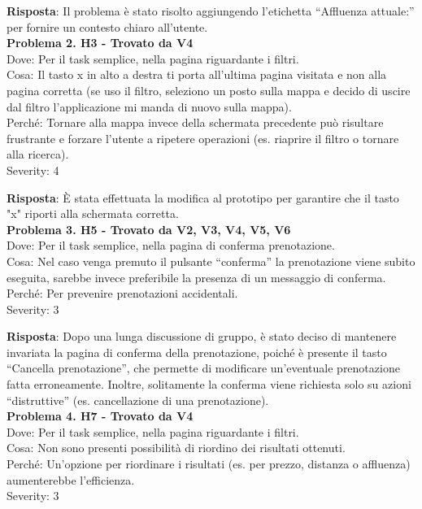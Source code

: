 \documentclass{article}
\begin{document}
\noindent \textbf{Risposta}: Il problema è stato risolto aggiungendo l’etichetta “Affluenza attuale:” per fornire un contesto chiaro all’utente.\\

\noindent \textbf{Problema 2. H3 - Trovato da V4} \\
Dove: Per il task semplice, nella pagina riguardante i filtri. \\
Cosa: Il tasto x in alto a destra ti porta all’ultima pagina visitata e non alla pagina corretta (se uso il filtro, seleziono un posto sulla mappa e decido di uscire dal filtro l’applicazione mi manda di nuovo sulla mappa). \\
Perché: Tornare alla mappa invece della schermata precedente può risultare frustrante e forzare l’utente a ripetere operazioni (es. riaprire il filtro o tornare alla ricerca). \\
Severity: 4

\noindent \textbf{Risposta}: È stata effettuata la modifica al prototipo per garantire che il tasto "x" riporti alla schermata corretta.\\

\noindent \textbf{Problema 3. H5 - Trovato da V2, V3, V4, V5, V6} \\
Dove: Per il task semplice, nella pagina di conferma prenotazione. \\
Cosa: Nel caso venga premuto il pulsante “conferma” la prenotazione viene subito eseguita, sarebbe invece preferibile la presenza di un messaggio di conferma. \\
Perché: Per prevenire prenotazioni accidentali. \\
Severity: 3

\noindent \textbf{Risposta}: Dopo una lunga discussione di gruppo, è stato deciso di mantenere invariata la pagina di conferma della prenotazione, poiché è presente il tasto “Cancella prenotazione”, che permette di modificare un’eventuale prenotazione fatta erroneamente. Inoltre, solitamente la conferma viene richiesta solo su azioni “distruttive” (es. cancellazione di una prenotazione).\\

\noindent \textbf{Problema 4. H7 - Trovato da V4} \\
Dove: Per il task semplice, nella pagina riguardante i filtri. \\
Cosa: Non sono presenti possibilità di riordino dei risultati ottenuti. \\
Perché: Un’opzione per riordinare i risultati (es. per prezzo, distanza o affluenza) aumenterebbe l’efficienza. \\
Severity: 3
\end{document}
